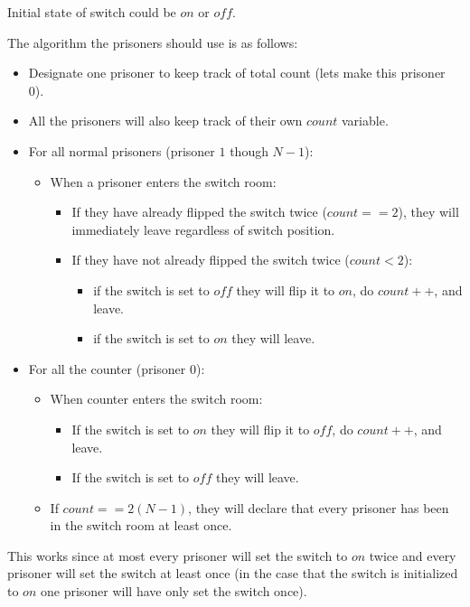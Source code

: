 \documentclass{article}
\begin{document}
Initial state of switch could be $on$ or $off$.

The algorithm the prisoners should use is as follows:
\begin{itemize}[label={}]
\item Designate one prisoner to keep track of total count (lets make this prisoner 0).
\item All the prisoners will also keep track of their own $count$ variable.

\item For all normal prisoners (prisoner $1$ though $N-1$):
	\begin{itemize}[label={}]
	\item When a prisoner enters the switch room:
		\begin{itemize}[label={}]
		\item If they have already flipped the switch twice ($count == 2$), they will immediately leave regardless of switch position.
		\item If they have not already flipped the switch twice ($count < 2$): 
			\begin{itemize}[label={}]
			\item if the switch is set to $off$ they will flip it to $on$, do $count++$, and leave.
			\item if the switch is set to $on$ they will leave.
			\end{itemize}
		\end{itemize}
	\end{itemize}
\item For all the counter (prisoner $0$):
	\begin{itemize}[label={}]
	\item When counter enters the switch room:
		\begin{itemize}[label={}]
		\item If the switch is set to $on$ they will flip it to $off$, do $count++$, and leave.
		\item If the switch is set to $off$ they will leave.
		\end{itemize}
	\item If $count == 2(N-1)$, they will declare that every prisoner has been in the switch room at least once.	
	\end{itemize}
\end{itemize}
This works since at most every prisoner will set the switch to $on$ twice and every prisoner will set the switch at least once (in the case that the switch is initialized to $on$ one prisoner will have only set the switch once).   
\end{document}
